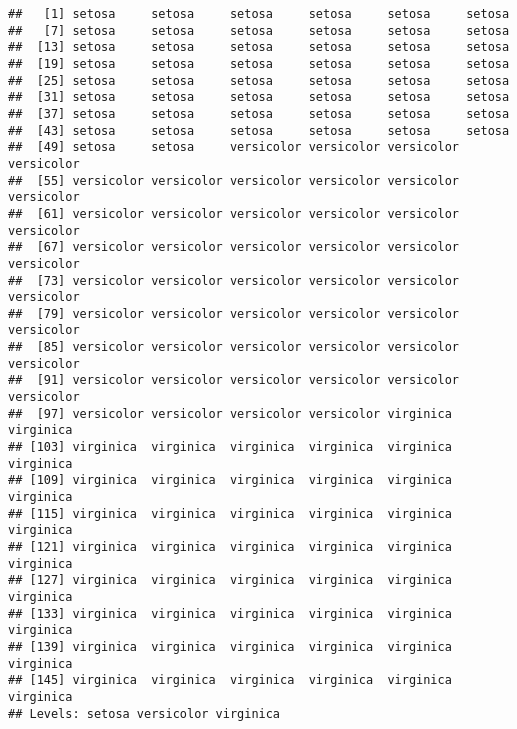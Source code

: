 \documentclass[
]{article}
\begin{document}
\begin{verbatim}
##   [1] setosa     setosa     setosa     setosa     setosa     setosa    
##   [7] setosa     setosa     setosa     setosa     setosa     setosa    
##  [13] setosa     setosa     setosa     setosa     setosa     setosa    
##  [19] setosa     setosa     setosa     setosa     setosa     setosa    
##  [25] setosa     setosa     setosa     setosa     setosa     setosa    
##  [31] setosa     setosa     setosa     setosa     setosa     setosa    
##  [37] setosa     setosa     setosa     setosa     setosa     setosa    
##  [43] setosa     setosa     setosa     setosa     setosa     setosa    
##  [49] setosa     setosa     versicolor versicolor versicolor versicolor
##  [55] versicolor versicolor versicolor versicolor versicolor versicolor
##  [61] versicolor versicolor versicolor versicolor versicolor versicolor
##  [67] versicolor versicolor versicolor versicolor versicolor versicolor
##  [73] versicolor versicolor versicolor versicolor versicolor versicolor
##  [79] versicolor versicolor versicolor versicolor versicolor versicolor
##  [85] versicolor versicolor versicolor versicolor versicolor versicolor
##  [91] versicolor versicolor versicolor versicolor versicolor versicolor
##  [97] versicolor versicolor versicolor versicolor virginica  virginica 
## [103] virginica  virginica  virginica  virginica  virginica  virginica 
## [109] virginica  virginica  virginica  virginica  virginica  virginica 
## [115] virginica  virginica  virginica  virginica  virginica  virginica 
## [121] virginica  virginica  virginica  virginica  virginica  virginica 
## [127] virginica  virginica  virginica  virginica  virginica  virginica 
## [133] virginica  virginica  virginica  virginica  virginica  virginica 
## [139] virginica  virginica  virginica  virginica  virginica  virginica 
## [145] virginica  virginica  virginica  virginica  virginica  virginica 
## Levels: setosa versicolor virginica
\end{verbatim}
\end{document}
